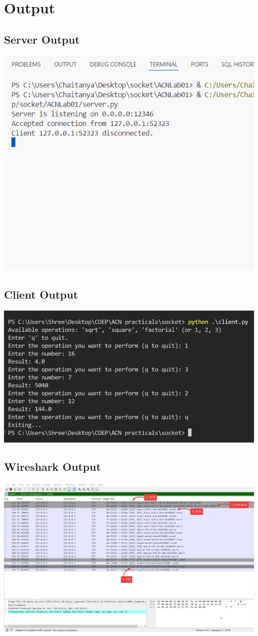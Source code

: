 \documentclass{article}
\begin{document}
\section{Output}
\subsection{Server Output}
\centering
\includegraphics{server.png}
\subsection{Client Output}
\centering
\includegraphics[width = 15cm]{client.jpeg}
\subsection{Wireshark Output}
\centering
\includegraphics[angle=270, width=\textwidth]{wireshark.png}
\end{document}
